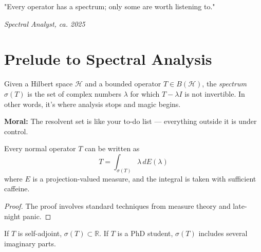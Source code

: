 \epigraph{"Every operator has a spectrum; only some are worth listening to."}{\textit{Spectral Analyst, ca. 2025}}

\section{Prelude to Spectral Analysis}
Given a Hilbert space $\mathcal{H}$ and a bounded operator $T \in B(\mathcal{H})$, 
the \emph{spectrum} $\sigma(T)$ is the set of complex numbers $\lambda$ for which $T - \lambda I$ 
is not invertible. 
In other words, it’s where analysis stops and magic begins.

\begin{tcolorbox}
\textbf{Moral:} The resolvent set is like your to-do list — everything outside it is under control.
\end{tcolorbox}

\begin{theorem}
Every normal operator $T$ can be written as
\[
T = \int_{\sigma(T)} \lambda \, dE(\lambda)
\]
where $E$ is a projection-valued measure, and the integral is taken with sufficient caffeine.
\end{theorem}

\begin{proof}
The proof involves standard techniques from measure theory and late-night panic.
\end{proof}

\begin{example}
If $T$ is self-adjoint, $\sigma(T) \subset \mathbb{R}$.  
If $T$ is a PhD student, $\sigma(T)$ includes several imaginary parts.
\end{example}
